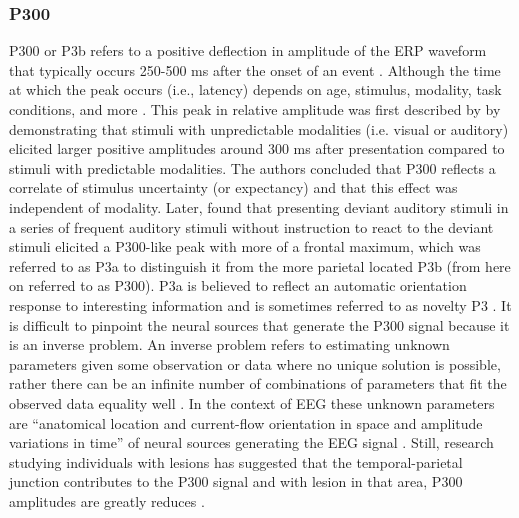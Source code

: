 \subsubsection{P300}
P300 or P3b refers to a positive deflection in amplitude of the ERP waveform that typically occurs 250-500 ms after the onset of an event \parencite{polichUpdatingP300Integrative2007}. Although the time at which the peak occurs (i.e., latency) depends on age, stimulus, modality, task conditions, and more \parencite{polichCognitiveBiologicalDeterminants1995}. This peak in relative amplitude was first described by \textcite{suttonEvokedPotentialCorrelatesStimulus1965} by demonstrating that stimuli with unpredictable modalities (i.e. visual or auditory) elicited larger positive amplitudes around 300 ms after presentation compared to stimuli with predictable modalities. The authors concluded that P300 reflects a correlate of stimulus uncertainty (or expectancy) and that this effect was independent of modality. Later,  \textcite{squiresTwoVarietiesLonglatency1975} found that presenting deviant auditory stimuli in a series of frequent auditory stimuli without instruction to react to the deviant stimuli elicited a P300-like peak with more of a frontal maximum, which was referred to as P3a to distinguish it from the more parietal located P3b (from here on referred to as P300). P3a is believed to reflect an automatic orientation response to interesting information and is sometimes referred to as novelty P3 \parencite{esceraInvoluntaryAttentionDistractibility2000, polichUpdatingP300Integrative2007}.
It is difficult to pinpoint the neural sources that generate the P300 signal because it is an inverse problem. An inverse problem refers to estimating unknown parameters given some observation or data where no unique solution is possible, rather there can be an infinite number of combinations of parameters that fit the observed data equality well \parencite{bailletForwardInverseProblems2013}.  In the context of EEG these unknown parameters are “anatomical location and current-flow orientation in space and amplitude variations in time” of neural sources generating the EEG signal \parencite[page. 1]{bailletForwardInverseProblems2013}. Still, research studying individuals with lesions has suggested that the temporal-parietal junction contributes to the P300 signal and with lesion in that area, P300 amplitudes are greatly reduces \parencite{knightContributionsTemporalparietalJunction1989, verlegerReductionP3bPatients1994}.

